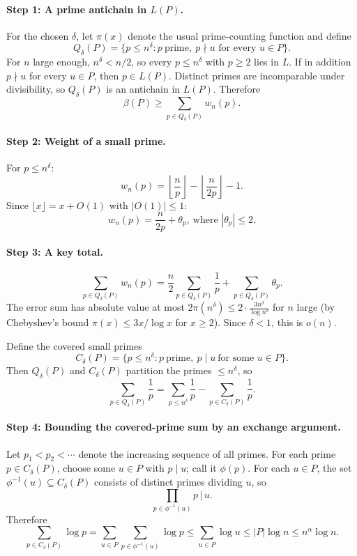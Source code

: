 \documentclass{article}
\begin{document}
\paragraph{Step 1: A prime antichain in $L(P)$.}
For the chosen $\delta$, let $\pi(x)$ denote the usual prime-counting function and define
\[Q_\delta(P) = \{p \le n^\delta : p\ \text{prime},\ p \nmid u \text{ for every } u \in P\}.\]
For $n$ large enough, $n^\delta < n/2$, so every $p \le n^\delta$ with $p \ge 2$ lies in $L$. If in addition $p \nmid u$ for every $u \in P$, then $p \in L(P)$. Distinct primes are incomparable under divisibility, so $Q_\delta(P)$ is an antichain in $L(P)$. Therefore
\[\beta(P) \ge \sum_{p \in Q_\delta(P)} w_n(p). \tag{1}\]

\paragraph{Step 2: Weight of a small prime.}
For $p \le n^\delta$:
\[w_n(p) = \left\lfloor \frac{n}{p} \right\rfloor - \left\lfloor \frac{n}{2p} \right\rfloor - 1.\]
Since $\lfloor x \rfloor = x + O(1)$ with $|O(1)| \le 1$:
\[w_n(p) = \frac{n}{2p} + \theta_p,\ \text{where } |\theta_p| \le 2.\]

\paragraph{Step 3: A key total.}
\[\sum_{p \in Q_\delta(P)} w_n(p) = \frac{n}{2} \sum_{p \in Q_\delta(P)} \frac{1}{p} + \sum_{p \in Q_\delta(P)} \theta_p.\]
The error sum has absolute value at most $2 \pi(n^\delta) \le 2 \cdot \frac{3 n^\delta}{\log n^\delta}$ for $n$ large (by Chebyshev's bound $\pi(x) \le 3x/\log x$ for $x \ge 2$). Since $\delta < 1$, this is $o(n)$.

Define the covered small primes
\[C_\delta(P) = \{p \le n^\delta : p\ \text{prime},\ p \mid u\ \text{for some } u \in P\}.\]
Then $Q_\delta(P)$ and $C_\delta(P)$ partition the primes $\le n^\delta$, so
\[\sum_{p \in Q_\delta(P)} \frac{1}{p} = \sum_{p \le n^\delta} \frac{1}{p} - \sum_{p \in C_\delta(P)} \frac{1}{p}. \tag{2}\]

\paragraph{Step 4: Bounding the covered-prime sum by an exchange argument.}
Let $p_1 < p_2 < \cdots$ denote the increasing sequence of all primes. For each prime $p \in C_\delta(P)$, choose some $u \in P$ with $p \mid u$; call it $\phi(p)$. For each $u \in P$, the set $\phi^{-1}(u) \subseteq C_\delta(P)$ consists of distinct primes dividing $u$, so
\[\prod_{p \in \phi^{-1}(u)} p \,\Big|\, u.\]
Therefore
\[\sum_{p \in C_\delta(P)} \log p = \sum_{u \in P} \sum_{p \in \phi^{-1}(u)} \log p \le \sum_{u \in P} \log u \le |P| \log n \le n^\alpha \log n. \tag{3}\]
\end{document}
